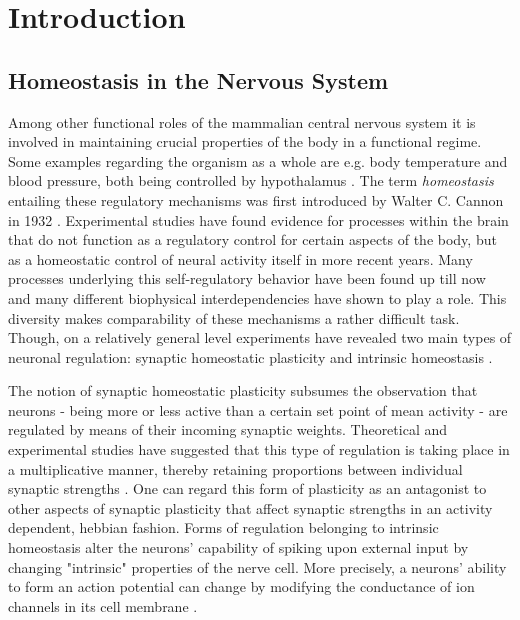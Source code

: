\documentclass[10pt,a4paper]{article}
\begin{document}
\section{Introduction}
\subsection{Homeostasis in the Nervous System}
Among other functional roles of the mammalian central nervous system it is involved in maintaining crucial properties of the body in a functional regime. Some examples regarding the organism as a whole are e.g. body temperature and blood pressure, both being controlled by hypothalamus \cite[p. 484]{Bear_Exploring_the_Brain}. The term \textit{homeostasis} entailing these regulatory mechanisms was first introduced by Walter C. Cannon in 1932 \cite{Wisdom_of_the_Body_Cannon, Homeostasis_Queenan_2012}. Experimental studies have found evidence for processes within the brain that do not function as a regulatory control for certain aspects of the body, but as a homeostatic control of neural activity itself \cite{Turrigiano_1994,Burrone_2003}in more recent years. Many processes underlying this self-regulatory behavior have been found up till now and many different biophysical interdependencies have shown to play a role. This diversity makes comparability of these mechanisms a rather difficult task. Though, on a relatively general level experiments have revealed two main types of neuronal regulation: synaptic homeostatic plasticity and intrinsic homeostasis \cite{Desai_2003}. 

The notion of synaptic homeostatic plasticity subsumes the observation that neurons - being more or less active than a certain set point of mean activity - are regulated by means of their incoming synaptic weights. Theoretical and experimental studies have suggested that this type of regulation is taking place in a multiplicative manner, thereby retaining proportions between individual synaptic strengths \cite{Syn_Plast_Abbott}. One can regard this form of plasticity as an antagonist to other aspects of synaptic plasticity that affect synaptic strengths in an activity dependent, hebbian fashion. Forms of regulation belonging to intrinsic homeostasis alter the neurons' capability of spiking upon external input by changing "intrinsic" properties of the nerve cell. More precisely, a neurons' ability to form an action potential can change by modifying the conductance of ion channels in its cell membrane \cite[p. 156]{Theor_Neur_Dayan}.
\end{document}
